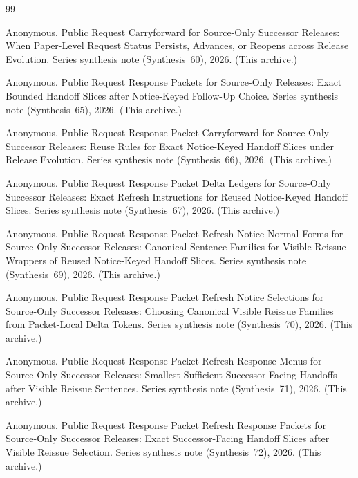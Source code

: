 \documentclass[11pt]{article}
\begin{document}
\begin{thebibliography}{99}\small

Anonymous.
\newblock Public Request Carryforward for Source-Only Successor Releases: When Paper-Level Request Status Persists, Advances, or Reopens across Release Evolution.
\newblock Series synthesis note (Synthesis~60), 2026. (This archive.)

Anonymous.
\newblock Public Request Response Packets for Source-Only Releases: Exact Bounded Handoff Slices after Notice-Keyed Follow-Up Choice.
\newblock Series synthesis note (Synthesis~65), 2026. (This archive.)

Anonymous.
\newblock Public Request Response Packet Carryforward for Source-Only Successor Releases: Reuse Rules for Exact Notice-Keyed Handoff Slices under Release Evolution.
\newblock Series synthesis note (Synthesis~66), 2026. (This archive.)

Anonymous.
\newblock Public Request Response Packet Delta Ledgers for Source-Only Successor Releases: Exact Refresh Instructions for Reused Notice-Keyed Handoff Slices.
\newblock Series synthesis note (Synthesis~67), 2026. (This archive.)

Anonymous.
\newblock Public Request Response Packet Refresh Notice Normal Forms for Source-Only Successor Releases: Canonical Sentence Families for Visible Reissue Wrappers of Reused Notice-Keyed Handoff Slices.
\newblock Series synthesis note (Synthesis~69), 2026. (This archive.)

Anonymous.
\newblock Public Request Response Packet Refresh Notice Selections for Source-Only Successor Releases: Choosing Canonical Visible Reissue Families from Packet-Local Delta Tokens.
\newblock Series synthesis note (Synthesis~70), 2026. (This archive.)

Anonymous.
\newblock Public Request Response Packet Refresh Response Menus for Source-Only Successor Releases: Smallest-Sufficient Successor-Facing Handoffs after Visible Reissue Sentences.
\newblock Series synthesis note (Synthesis~71), 2026. (This archive.)

Anonymous.
\newblock Public Request Response Packet Refresh Response Packets for Source-Only Successor Releases: Exact Successor-Facing Handoff Slices after Visible Reissue Selection.
\newblock Series synthesis note (Synthesis~72), 2026. (This archive.)


\end{thebibliography}
\end{document}
